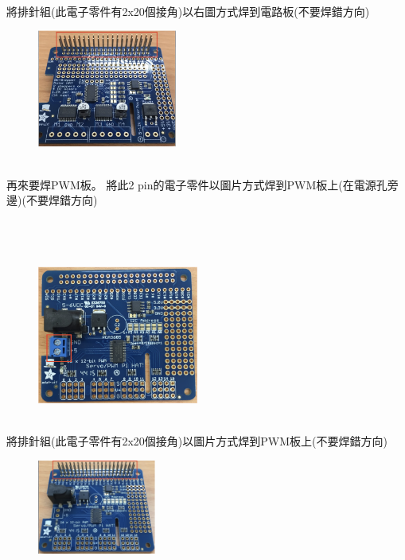 \documentclass{article}
\begin{document}
\\
將排針組(此電子零件有2x20個接角)以右圖方式焊到電路板(不要焊錯方向)
\\
\begin{figure}[htp]
    \begin{center}
        \includegraphics[width=130pt]{pic/1_1_24.png}
    \end{center}
\end{figure}
\\
再來要焊PWM板。 將此2 pin的電子零件以圖片方式焊到PWM板上(在電源孔旁邊)(不要焊錯方向) 
\\\\\\\\
\begin{figure}[htp]
    \begin{center}
        \includegraphics[width=150pt]{pic/1_1_9.png}
    \end{center}
\end{figure}
\\
將排針組(此電子零件有2x20個接角)以圖片方式焊到PWM板上(不要焊錯方向)
\\
\begin{figure}[htp]
    \begin{center}
        \includegraphics[width=110pt]{pic/1_1_10.png}
    \end{center}
\end{figure}
\end{document}
